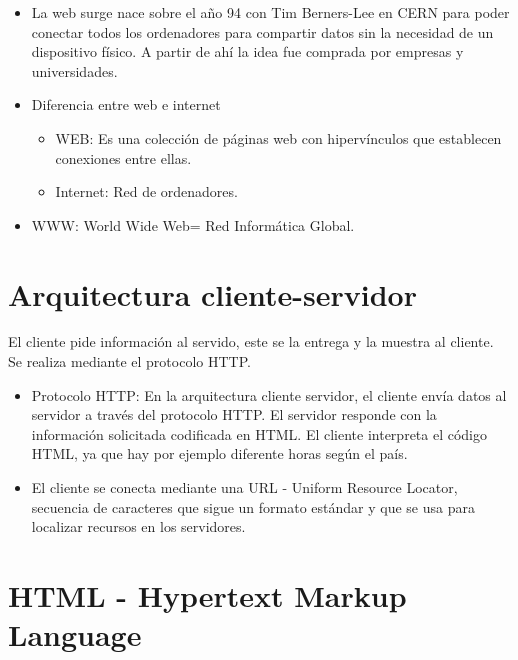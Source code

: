 \documentclass[12pt, twoside, openright]{report} %
\begin{document}
  

  \begin{itemize}
  
  \item
    La web surge nace sobre el año 94 con Tim Berners-Lee en CERN para
    poder conectar todos los ordenadores para compartir datos sin la
    necesidad de un dispositivo físico. A partir de ahí la idea fue
    comprada por empresas y universidades.
  \item
    Diferencia entre web e internet

    \begin{itemize}
    
    \item
      WEB: Es una colección de páginas web con hipervínculos que
      establecen conexiones entre ellas.
    \item
      Internet: Red de ordenadores.
    \end{itemize}
  \item
    WWW: World Wide Web= Red Informática Global.
  \end{itemize}

\section{Arquitectura cliente-servidor}

  El cliente pide información al servido, este se la entrega y la
  muestra al cliente. Se realiza mediante el protocolo HTTP.

  \begin{itemize}
  
  \item
    Protocolo HTTP: En la arquitectura cliente servidor, el cliente
    envía datos al servidor a través del protocolo HTTP. El servidor
    responde con la información solicitada codificada en HTML. El
    cliente interpreta el código HTML, ya que hay por ejemplo diferente
    horas según el país.
  \item
    El cliente se conecta mediante una URL - Uniform Resource Locator,
    secuencia de caracteres que sigue un formato estándar y que se usa
    para localizar recursos en los servidores.
  \end{itemize}

\section{HTML - Hypertext Markup Language}
\end{document}
